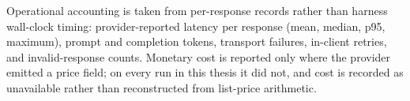 Operational accounting is taken from per-response records rather than
harness wall-clock timing: provider-reported latency per response (mean,
median, p95, maximum), prompt and completion tokens, transport failures,
in-client retries, and invalid-response counts. Monetary cost is
reported only where the provider emitted a price field; on every run in
this thesis it did not, and cost is recorded as unavailable rather than
reconstructed from list-price arithmetic.
